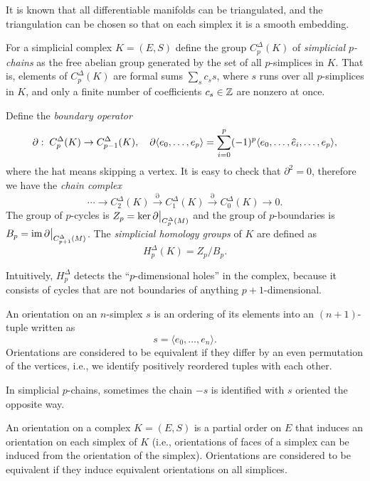 It is known that all differentiable manifolds can be triangulated, and the triangulation can be chosen so that on each simplex it is a smooth embedding.

\begin{defn}
    For a simplicial complex $K=(E,S)$ define the group $C^\Delta_p(K)$ of \emph{simplicial $p$-chains} as the free abelian group generated by the set of all $p$-simplices in $K$. That is, elements of $C^\Delta_p(K)$ are formal sums $\sum_{s} c_s s$, where $s$ runs over all $p$-simplices in $K$, and only a finite number of coefficients $c_s\in \mathbb{Z}$ are nonzero at once.
    
    Define the \emph{boundary operator}
    \[\partial:\; C^\Delta_p(K)\to C^\Delta_{p-1}(K),\quad \partial\langle e_0,\ldots,e_p\rangle=\sum_{i=0}^p(-1)^p\langle e_0,\ldots,\wh{e}_i,\ldots,e_p\rangle,\]
    where the hat means skipping a vertex. It is easy to check that $\partial^2=0$, therefore we have the \emph{chain complex}
    \[\cdots\to C^\Delta_2(K)\overset\partial\to C^\Delta_1(K)\overset\partial\to C^\Delta_0(K)\to 0.\]
    The group of $p$-cycles is $Z_p=\ker \restr{\partial}{C^\Delta_p(M)}$ and the group of $p$-boundaries is $B_p=\restr{\im\partial}{C^\Delta_{p+1}(M)}$. The \emph{simplicial homology groups} of $K$ are defined as
    \[H^\Delta_p(K)=Z_p/B_p.\]
\end{defn}

Intuitively, $H^\Delta_p$ detects the ``$p$-dimensional holes'' in the complex, because it consists of cycles that are not boundaries of anything $p+1$-dimensional.

\begin{defn}
    An orientation on an $n$-simplex $s$ is an ordering of its elements into an $(n+1)$-tuple written as \[s=\langle e_0,\ldots,e_n\rangle.\]
    Orientations are considered to be equivalent if they differ by an even permutation of the vertices, i.e., we identify positively reordered tuples with each other. 
    
    In simplicial $p$-chains, sometimes the chain $-s$ is identified with $s$ oriented the opposite way.
    
    An orientation on a complex $K=(E,S)$ is a partial order on $E$ that induces an orientation on each simplex of $K$ (i.e., orientations of faces of a simplex can be induced from the orientation of the simplex). Orientations are considered to be equivalent if they induce equivalent orientations on all simplices.
\end{defn}

